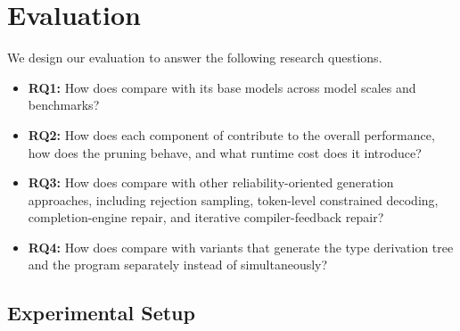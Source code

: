 \section{Evaluation \label{sec:evaluation}}
We design our evaluation to answer the following research questions.
\begin{itemize}
    \item \textbf{RQ1:} How does \mainname compare with its base models across model scales and benchmarks?
    \item \textbf{RQ2:} How does each component of \mainname contribute to the overall performance, how does the pruning behave, and what runtime cost does it introduce?
    \item \textbf{RQ3:} How does \mainname compare with other reliability-oriented generation approaches, including rejection sampling, token-level constrained decoding, completion-engine repair, and iterative compiler-feedback repair?
    \item \textbf{RQ4:} How does \mainname compare with variants that generate the type derivation tree and the program separately instead of simultaneously?
\end{itemize}

\subsection{Experimental Setup}

